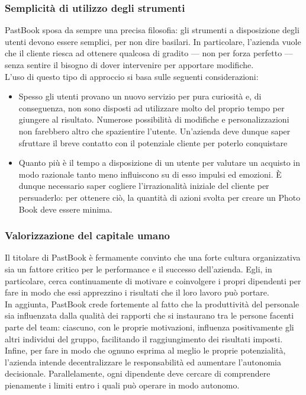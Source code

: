 			\subsubsection{Semplicità di utilizzo degli strumenti}
				PastBook sposa da sempre una precisa filosofia: gli strumenti a disposizione degli utenti devono essere semplici,
				per non dire basilari. In particolare, l'azienda vuole che il cliente riesca ad ottenere qualcosa di gradito — non
				per forza perfetto — senza sentire il bisogno di dover intervenire per apportare modifiche.\\
				L'uso di questo tipo di approccio si basa sulle seguenti considerazioni:
				\begin{itemize}
					\item Spesso gli utenti provano un nuovo servizio per pura curiosità e, di conseguenza, non sono disposti ad
					utilizzare molto del proprio tempo per giungere al risultato. Numerose possibilità di modifiche e
					personalizzazioni non farebbero altro che spazientire l'utente. Un'azienda deve dunque saper sfruttare il
					breve contatto con il potenziale cliente per poterlo conquistare
					\item Quanto più è il tempo a disposizione di un utente per valutare un acquisto in modo razionale tanto
					meno influiscono su di esso impulsi ed emozioni. È dunque necessario saper cogliere l'irrazionalità iniziale
					del cliente per persuaderlo: per ottenere ciò, la quantità di azioni svolta per creare un Photo Book deve
					essere minima.
				\end{itemize}
			\subsubsection{Valorizzazione del capitale umano}
				Il titolare di PastBook è fermamente convinto che una forte cultura organizzativa sia un fattore critico per le
				performance e il successo dell'azienda. Egli, in particolare, cerca continuamente di motivare e coinvolgere i propri
				dipendenti per fare in modo che essi apprezzino i risultati che il loro lavoro può portare.\\
				In aggiunta, PastBook crede fortemente al fatto che la produttività del personale sia influenzata dalla qualità dei
				rapporti che si instaurano tra le persone facenti parte del team: ciascuno, con le proprie motivazioni, influenza
				positivamente gli altri individui del gruppo, facilitando il raggiungimento dei risultati imposti.\\
				
				Infine, per fare in modo che ognuno esprima al meglio le proprie potenzialità, l'azienda intende decentralizzare le
				responsabilità ed aumentare l'autonomia decisionale. Parallelamente, ogni dipendente deve cercare di comprendere
				pienamente i limiti entro i quali può operare in modo autonomo.
